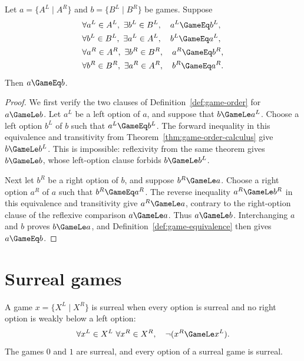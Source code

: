 \begin{theorem}
  \label{thm:option-extensionality}
  \leanok
  Let \(a=\{A^L\mid A^R\}\) and \(b=\{B^L\mid B^R\}\) be games.  Suppose
  \[
    \begin{aligned}
      &\forall a^L\in A^L,\ \exists b^L\in B^L,\quad a^L\GameEq b^L,\\
      &\forall b^L\in B^L,\ \exists a^L\in A^L,\quad b^L\GameEq a^L,\\
      &\forall a^R\in A^R,\ \exists b^R\in B^R,\quad a^R\GameEq b^R,\\
      &\forall b^R\in B^R,\ \exists a^R\in A^R,\quad b^R\GameEq a^R.
    \end{aligned}
  \]
  Then \(a\GameEq b\).
\end{theorem}
\begin{proof}
  \leanok
  We first verify the two clauses of Definition~\ref{def:game-order} for
  \(a\GameLe b\).  Let \(a^L\) be a left option of \(a\), and suppose that
  \(b\GameLe a^L\).  Choose a left option \(b^L\) of \(b\) such that
  \(a^L\GameEq b^L\).  The forward inequality in this equivalence and
  transitivity from Theorem~\ref{thm:game-order-calculus} give
  \(b\GameLe b^L\).  This is impossible: reflexivity from the same theorem
  gives \(b\GameLe b\), whose left-option clause forbids
  \(b\GameLe b^L\).

  Next let \(b^R\) be a right option of \(b\), and suppose
  \(b^R\GameLe a\).  Choose a right option \(a^R\) of \(a\) such that
  \(b^R\GameEq a^R\).  The reverse inequality \(a^R\GameLe b^R\) in this
  equivalence and transitivity
  give \(a^R\GameLe a\), contrary to the right-option clause of the reflexive
  comparison \(a\GameLe a\).  Thus \(a\GameLe b\).  Interchanging \(a\) and
  \(b\) proves \(b\GameLe a\), and Definition~\ref{def:game-equivalence} then gives
  \(a\GameEq b\).
\end{proof}

\section{Surreal games}

\begin{definition}
  \label{def:is-surreal}
  \leanok
  A game \(x=\{X^L\mid X^R\}\) is surreal when every option is surreal and no right option is
  weakly below a left option:
  \[
    \forall x^L\in X^L\ \forall x^R\in X^R,
      \quad \neg(x^R\GameLe x^L).
  \]
  The games \(0\) and \(1\) are surreal, and every option of a surreal game is surreal.
\end{definition}


